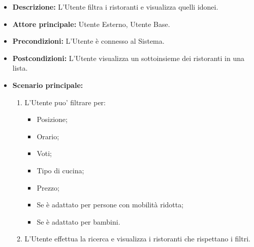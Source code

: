 \label{usecase:Filtro ristoranti}
    \begin{itemize}
    \item \textbf{Descrizione:} L'Utente filtra i ristoranti e visualizza quelli idonei.

    \item \textbf{Attore principale:} Utente Esterno, Utente Base.

    \item \textbf{Precondizioni:} L'Utente è connesso al Sistema.

    \item \textbf{Postcondizioni:} L'Utente visualizza un sottoinsieme dei ristoranti in una lista.

    \item \textbf{Scenario principale:}
    \begin{enumerate}
        \item L'Utente puo' filtrare per:
        \begin{itemize}
            \item Posizione;
            \item Orario;
            \item Voti;
            \item Tipo di cucina;
            \item Prezzo;
            \item Se è adattato per persone con mobilità ridotta;
            \item Se è adattato per bambini.
        \end{itemize}
        \item L'Utente effettua la ricerca e visualizza i ristoranti che rispettano i filtri.
    \end{enumerate}
\end{itemize}